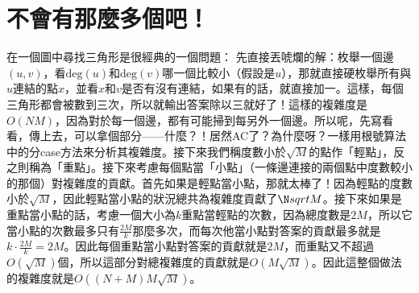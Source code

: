 \section{不會有那麼多個吧！}
	在一個圖中尋找三角形是很經典的一個問題：
	先直接丟唬爛的解：枚舉一個邊$(u, v)$，看$\text{deg}(u)$和$\text{deg}(v)$哪一個比較小（假設是$u$），那就直接硬枚舉所有與$u$連結的點$x$，並看$x$和$v$是否有沒有連結，如果有的話，就直接加一。這樣，每個三角形都會被數到三次，所以就輸出答案除以三就好了！這樣的複雜度是$O(NM)$，因為對於每一個邊，都有可能掃到每另外一個邊。所以呢，先寫看看，傳上去，可以拿個部分——什麼？！居然AC了？為什麼呀？一樣用根號算法中的分case方法來分析其複雜度。接下來我們稱度數小於$\sqrt{M}$的點作「輕點」，反之則稱為「重點」。接下來考慮每個點當「小點」（一條邊連接的兩個點中度數較小的那個）對複雜度的貢獻。首先如果是輕點當小點，那就太棒了！因為輕點的度數小於$\sqrt{M}$，因此輕點當小點的狀況總共為複雜度貢獻了$\N sqrt{M}$。接下來如果是重點當小點的話，考慮一個大小為$k$重點當輕點的次數，因為總度數是$2M$，所以它當小點的次數最多只有$\frac{2M}{k}$那麼多次，而每次他當小點對答案的貢獻最多就是$k \cdot \frac{2M}{k} = 2M$。因此每個重點當小點對答案的貢獻就是$2M$，而重點又不超過$O(\sqrt{M})$個，所以這部分對總複雜度的貢獻就是$O(M\sqrt{M})$。因此這整個做法的複雜度就是$O((N+M)M\sqrt{M})$。
